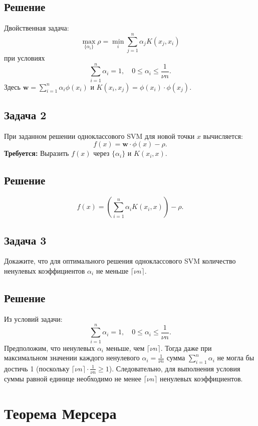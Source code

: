 \subsection{Решение}
Двойственная задача:
\[
\max_{\{\alpha_i\}} \rho = \min_i \sum_{j=1}^n \alpha_j K(x_j,x_i)
\]
при условиях
\[
\sum_{i=1}^n \alpha_i = 1,\quad 0 \le \alpha_i \le \frac{1}{\nu n}.
\]
Здесь $\mathbf{w} = \sum_{i=1}^n \alpha_i \phi(x_i)$ и $K(x_i,x_j)=\phi(x_i)\cdot \phi(x_j)$.

\hrulefill

\subsection{Задача 2}
При заданном решении одноклассового SVM для новой точки $x$ вычисляется:
\[
f(x)=\mathbf{w}\cdot\phi(x)-\rho.
\]
\textbf{Требуется:} Выразить $f(x)$ через $\{\alpha_i\}$ и $K(x_i,x)$.

\subsection{Решение}
\[
f(x) = \left(\sum_{i=1}^n \alpha_i K(x_i,x)\right) - \rho.
\]

\hrulefill

\subsection{Задача 3}
Докажите, что для оптимального решения одноклассового SVM количество ненулевых коэффициентов $\alpha_i$ не меньше $\lceil\nu n\rceil$.

\subsection{Решение}
Из условий задачи:
\[
\sum_{i=1}^n \alpha_i = 1,\quad 0 \le \alpha_i \le \frac{1}{\nu n}.
\]
Предположим, что ненулевых $\alpha_i$ меньше, чем $\lceil\nu n\rceil$. Тогда даже при максимальном значении каждого ненулевого $\alpha_i = \frac{1}{\nu n}$ сумма $\sum_{i=1}^n \alpha_i$ не могла бы достичь 1 (поскольку $\lceil \nu n \rceil \cdot \frac{1}{\nu n}\ge1$). Следовательно, для выполнения условия суммы равной единице необходимо не менее $\lceil\nu n\rceil$ ненулевых коэффициентов.


\section{Теорема Мерсера}


